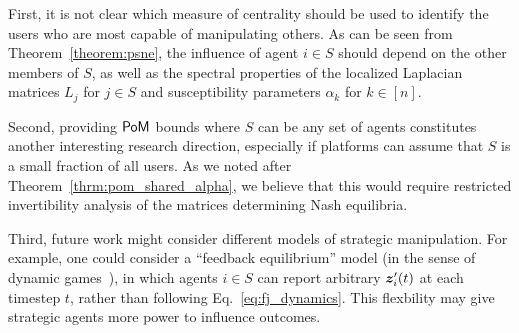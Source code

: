First, it is not clear which measure of centrality should be used to identify the users who are most capable of manipulating others. As can be seen from Theorem~\ref{theorem:psne}, the influence of agent $i \in S$ should depend on the other members of $S$, as well as the spectral properties of the localized Laplacian matrices $L_j$ for $j \in S$ and susceptibility parameters $\alpha_k$ for $k \in [n]$. 

Second, providing $\mathsf{PoM}$ bounds where $S$ can be any set of agents constitutes another interesting research direction, especially if platforms can assume that $S$ is a small fraction of all users. As we noted after Theorem~\ref{thrm:pom_shared_alpha}, we believe that this would require restricted invertibility analysis of the matrices determining Nash equilibria. 

Third, future work might consider different models of strategic manipulation. For example, one could consider a ``feedback equilibrium'' model (in the sense of dynamic games~\cite{li2024computation}), in which agents $i \in S$ can report arbitrary $\bm{z}_i^\prime(t)$ at each timestep $t$, rather than following Eq.~\eqref{eq:fj_dynamics}. This flexbility may give strategic agents more power to influence outcomes. 
















